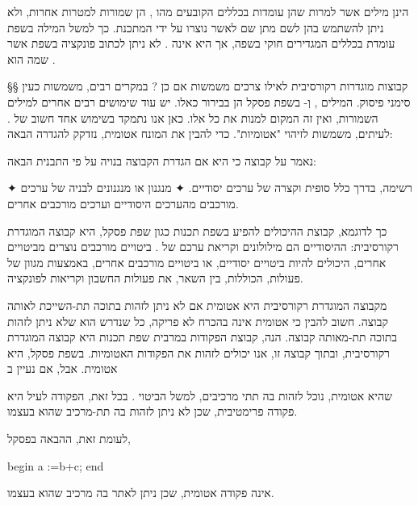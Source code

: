  הינן מילים אשר למרות שהן עומדות בכללים
הקובעים מהו , הן שמורות למטרות אחרות, ולא ניתן להשתמש בהן לשם מתן שם
ל אשר נוצרו על ידי המתכנת. כך למשל המילה  בשפת  עומדת בכללים
המגדירים  חוקי בשפה, אך היא אינה . לא ניתן לכתוב פונקציה בשפת 
אשר שמה הוא .

§§ קבוצות מוגדרות רקורסיבית
לאילו צרכים משמשות אם כן ? במקרים
רבים,  משמשות כעין סימני פיסוק. המילים
,  וְ- בשפת פסקל הן בבירור כאלו. יש עוד שימושים
רבים אחרים למילים השמורות, ואין זה המקום למנות את כל אלו. כאן אנו נתמקד בשימוש
אחד חשוב של . לעיתים,  משמשות לזיהוי  "אטומיות". כדי להבין את המונח  אטומית,
נזדקק להגדרה הבאה:

נאמר על קבוצה כי היא 
אם הגדרת הקבוצה בנויה על פי התבנית הבאה:
\begin{ספרור}
✦ רשימה, בדרך כלל סופית וקצרה של ערכים יסודיים.
✦ מנגנון או מנגנונים לבניה של ערכים מורכבים מהערכים היסודיים
וערכים מורכבים אחרים.
\end{ספרור}

כך לדוגמא, קבוצת ה היכולים להפיע בשפת תכנות כגון שפת פסקל, היא קבוצה
המוגדרת רקורסיבית: ה היסודיים הם מילולונים וקריאת ערכם של .
ביטויים מורכבים נוצרים מביטויים אחרים, היכולים להיות ביטויים יסודיים, או
ביטויים מורכבים אחרים, באמצעות מגוון של פעולות, הכוללות, בין השאר, את פעולות
החשבון וקריאות לפונקציה.

 מקבוצה המוגדרת רקורסיבית היא  אטומית אם לא ניתן לזהות בתוכה
תת- השייכת לאותה קבוצה. חשוב להבין כי  אטומית אינה בהכרח לא פריקה,
כל שנדרש הוא שלא ניתן לזהות בתוכה תת- מאותה קבוצה. הנה, קבוצת הפקודות
במרבית שפת תכנות היא קבוצה המוגדרת רקורסיבית, ובתוך קבוצה זו, אנו יכולים לזהות
את הפקודות האטומיות. בשפת פסקל,  היא  אטומית. אבל, אם נעיין ב
\begin{קוד}
\end{קוד}
שהיא  אטומית, נוכל לזהות בה תתי מרכיבים, למשל הביטוי . בכל זאת,
הפקודה לעיל היא פקודה פרימטיבית, שכן לא ניתן לזהות בה תת-מרכיב שהוא
 בעצמו.

לעומת זאת, ה הבאה בפסקל,
\begin{קוד}
\begin{PASCAL}
begin
  a :=b+c;
end
\end{PASCAL}
\end{קוד}
אינה פקודה אטומית, שכן ניתן לאתר בה מרכיב שהוא  בעצמו.


